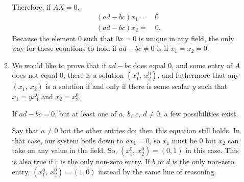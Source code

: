 \documentclass[12pt]{article}
\begin{document}
\begin{enumerate}
\begin{enumerate}
          Therefore, if $AX = 0$,
          \begin{align*}
            (ad - bc)x_1 =&\ 0\\
            (ad - bc)x_2 =&\ 0.
          \end{align*}
          Because the element $0$ such that $0x = 0$ is unique in
          any field, the only way for these equations to hold if
          $ad - bc \neq 0$ is if $x_1 = x_2 = 0$.

        \item
          We would like to prove that if $ad - bc$ does equal
          $0$, and some entry of $A$ does not equal $0$, there is
          a solution $(x_{1}^{0},\ x_{2}^{0})$, and futhermore
          that any $(x_1,\ x_2)$ is a solution if and only if
          there is some scalar $y$ such that $x_1 = yx_{1}^{0}$
          and $x_2 = x_{2}^{0}$.

          If $ad - bc = 0$, but at least one of $a,\ b,\ c,\ d
          \neq 0$, a few possibilities exist.

          Say that $a \neq 0$ but the other entries do; then this
          equation still holds. In that case, our system boils
          down to $ax_1 = 0$, so $x_1$ must be $0$ but $x_2$ can
          take on any value in the field. So, $(x_{1}^{0},\
          x_{2}^{0}) = (0,1)$ in this case. This is also true if
          $c$ is the only non-zero entry. If $b$ or $d$ is the
          only non-zero entry, $(x_{1}^{0},\ x_{2}^{0}) = (1,0)$
          instead by the same line of reasoning.


\end{enumerate}
\end{enumerate}
\end{document}

